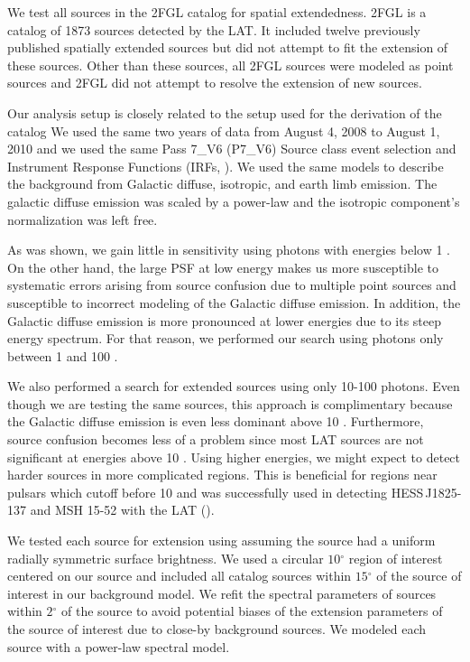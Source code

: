 \documentclass[12pt,preprint]{aastex}
\newcommand{\gev}{\text{GeV}\xspace}
\renewcommand{\deg}{\ensuremath{^\circ}\xspace}
\newcommand{\pointlike}{\text{\em pointlike}\xspace}
\begin{document}
We test all sources in the 2FGL catalog for spatial extendedness.
2FGL is a catalog of 1873 sources detected by the LAT.  It included
twelve previously published spatially extended sources but did not
attempt to fit the extension of these sources. Other than these sources,
all 2FGL sources were modeled as point sources and 2FGL did not attempt
to resolve the extension of new sources.

Our analysis setup is closely related to the setup used for the
derivation of the catalog We used the same two years of data from August
4, 2008 to August 1, 2010 and we used the same Pass 7\_V6 (P7\_V6)
Source class event selection and Instrument Response Functions (IRFs,
\cite{lat_on_orbit_psf}).  We used the same models to describe the
background from Galactic diffuse, isotropic, and earth limb emission.
The galactic diffuse emission was scaled by a power-law and the isotropic
component's normalization was left free.

As was shown, we gain little in sensitivity using photons with energies
below 1 \gev. On the other hand, the large PSF at low energy makes us
more susceptible to systematic errors arising from source confusion due
to multiple point sources and susceptible to incorrect modeling of the
Galactic diffuse emission. In addition, the Galactic diffuse emission
is more pronounced at lower energies due to its steep energy spectrum.
For that reason, we performed our search using photons only between 1
\gev and 100 \gev. 

We also performed a search for extended sources using only 10-100 \gev photons. 
Even though we are testing the same
sources, this approach is complimentary because the Galactic diffuse
emission is even less dominant above 10 \gev. Furthermore, source
confusion becomes less of a problem since most LAT sources are not
significant at energies above 10 \gev.  Using higher energies, we might
expect to detect harder sources in more complicated regions. This is
beneficial for regions near pulsars which cutoff before 10 \gev and was
successfully used in detecting HESS\,J1825-137 and MSH 15-52 with the LAT
(\cite{msh1552,fermi_hess_j1825}).

We tested each source for extension using
\pointlike
assuming the source had a uniform radially symmetric surface brightness.
We used a circular $10\deg$ region of interest centered on our source and
included all catalog sources within $15\deg$ of the source of interest
in our background model.
We refit the spectral parameters of sources within $2\deg$ of the source
to avoid potential biases of the extension parameters of the source of
interest due to close-by background sources.
We modeled each source with a power-law spectral model. 
\end{document}
